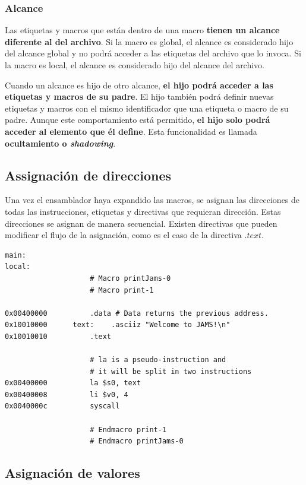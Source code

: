 \subsubsection{Alcance}\label{subsubsec:alcance}

Las etiquetas y macros que están dentro de una macro
\textbf{tienen un alcance diferente al del archivo}.
Si la macro es global, el alcance es considerado hijo del alcance global
y no podrá acceder a las etiquetas del archivo que lo invoca.
Si la macro es local, el alcance es considerado hijo del alcance del archivo.

Cuando un alcance es hijo de otro alcance,
\textbf{el hijo podrá acceder a las etiquetas y macros de su padre}.
El hijo también podrá definir nuevas etiquetas y macros con el mismo
identificador que una etiqueta o macro de su padre.
Aunque este comportamiento está permitido, \textbf{el hijo solo podrá acceder
al elemento que él define}.
Esta funcionalidad es llamada \textbf{ocultamiento o \textit{shadowing}}.

\subsection{Assignación de direcciones}\label{subsec:assignacion-de-direcciones}

Una vez el ensamblador haya expandido las macros,
se asignan las direcciones de todas las instrucciones,
etiquetas y directivas que requieran dirección.
Estas direcciones se asignan de manera secuencial.
Existen directivas que pueden modificar el flujo de la asignación,
como es el caso de la directiva $.text$.

\begin{lstlisting}[frame=single,label={lst:address-assignation}]
main:
local:
                    # Macro printJams-0
                    # Macro print-1

0x00400000          .data # Data returns the previous address.
0x10010000      text:    .asciiz "Welcome to JAMS!\n"
0x10010010          .text

                    # la is a pseudo-instruction and
                    # it will be split in two instructions
0x00400000          la $s0, text
0x00400008          li $v0, 4
0x0040000c          syscall

                    # Endmacro print-1
                    # Endmacro printJams-0
\end{lstlisting}

\subsection{Asignación de valores}\label{subsec:asignacion-de-valores}

